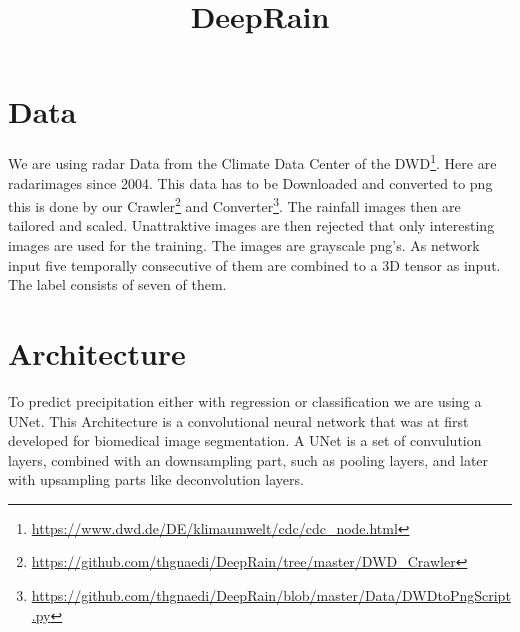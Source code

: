 \documentclass[oneside]{htwg-report}
\begin{document}



\newcommand{\verfasserA}{Thomas Gnädig}
\newcommand{\verfasserB}{Etienne Gramlich}
\newcommand{\verfasserC}{Merle Wolff}
\newcommand{\verfasserD}{Tim Hardenacke}
\newcommand{\verfasserE}{}
\newcommand{\thema}{DeepRain}
\newcommand{\hoschschule}{Hochschule für Technik, Wirtschaft und Gestaltung}
\newcommand{\institut}{HTWG Konstanz, Institut für Optische Systeme}
\newcommand{\prueferA}{Oliver Dürr}
\newcommand{\prueferB}{}


\title[Teamprojektthema]{\thema}


\makecover[]


\twocolumn
\section*{Data}
We are using radar Data from the Climate Data Center of the DWD\footnote{\url{https://www.dwd.de/DE/klimaumwelt/cdc/cdc_node.html}}. Here are radarimages since 2004. 
This data has to be Downloaded and converted to png this is done by our Crawler\footnote{\url{https://github.com/thgnaedi/DeepRain/tree/master/DWD_Crawler}} and Converter\footnote{\url{https://github.com/thgnaedi/DeepRain/blob/master/Data/DWDtoPngScript.py}}.
The rainfall images then are tailored and scaled. Unattraktive images are then rejected that only interesting images are used for the training.
The images are grayscale png's. As network input five temporally consecutive of them are combined to a 3D tensor as input. The label consists of seven of them.

\section*{Architecture}
To predict precipitation either with regression or classification we are using a UNet.
This Architecture is a convolutional neural network that was at first developed for biomedical image segmentation.
A UNet is a set of convulution layers, combined with an downsampling part, such as pooling layers, and later with upsampling parts like deconvolution layers.
\end{document}
